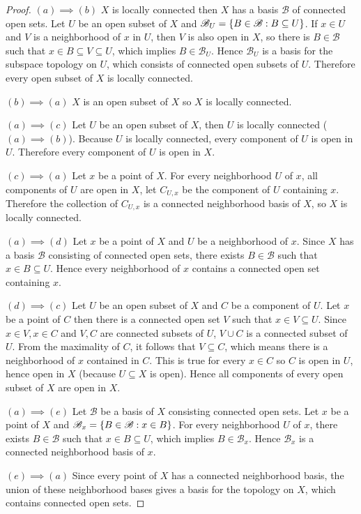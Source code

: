 \begin{proof}
	$(a)\implies (b)$ $X$ is locally connected then $X$ has a basis $\mathscr{B}$ of connected open sets. Let $U$ be an open subset of $X$ and $\mathscr{B}_{U} = \left\{{ B\in \mathscr{B} : B\subseteq U }\right\}$. If $x\in U$ and $V$ is a neighborhood of $x$ in $U$, then $V$ is also open in $X$, so there is $B\in\mathscr{B}$ such that $x\in B\subseteq V\subseteq U$, which implies $B\in\mathscr{B}_{U}$. Hence $\mathscr{B}_{U}$ is a basis for the subspace topology on $U$, which consists of connected open subsets of $U$. Therefore every open subset of $X$ is locally connected.

	$(b)\implies (a)$ $X$ is an open subset of $X$ so $X$ is locally connected.

	$(a)\implies (c)$ Let $U$ be an open subset of $X$, then $U$ is locally connected ($(a) \implies (b)$). Because $U$ is locally connected, every component of $U$ is open in $U$. Therefore every component of $U$ is open in $X$.

	$(c)\implies (a)$ Let $x$ be a point of $X$. For every neighborhood $U$ of $x$, all components of $U$ are open in $X$, let $C_{U,x}$ be the component of $U$ containing $x$. Therefore the collection of $C_{U,x}$ is a connected neighborhood basis of $X$, so $X$ is locally connected.

	$(a)\implies (d)$ Let $x$ be a point of $X$ and $U$ be a neighborhood of $x$. Since $X$ has a basis $\mathscr{B}$ consisting of connected open sets, there exists $B\in\mathscr{B}$ such that $x \in B\subseteq U$. Hence every neighborhood of $x$ contains a connected open set containing $x$.

	$(d)\implies (c)$ Let $U$ be an open subset of $X$ and $C$ be a component of $U$. Let $x$ be a point of $C$ then there is a connected open set $V$ such that $x\in V\subseteq U$. Since $x\in V, x\in C$ and $V, C$ are connected subsets of $U$, $V\cup C$ is a connected subset of $U$. From the maximality of $C$, it follows that $V\subseteq C$, which means there is a neighborhood of $x$ contained in $C$. This is true for every $x\in C$ so $C$ is open in $U$, hence open in $X$ (because $U\subseteq X$ is open). Hence all components of every open subset of $X$ are open in $X$.

	$(a)\implies (e)$ Let $\mathscr{B}$ be a basis of $X$ consisting connected open sets. Let $x$ be a point of $X$ and $\mathscr{B}_{x} = \left\{{ B\in\mathscr{B}: x\in B }\right\}$. For every neighborhood $U$ of $x$, there exists $B\in\mathscr{B}$ such that $x\in B\subseteq U$, which implies $B\in \mathscr{B}_{x}$. Hence $\mathscr{B}_{x}$ is a connected neighborhood basis of $x$.

	$(e)\implies (a)$ Since every point of $X$ has a connected neighborhood basis, the union of these neighborhood bases gives a basis for the topology on $X$, which contains connected open sets.
\end{proof}

